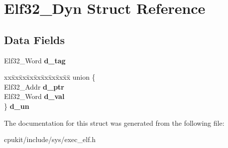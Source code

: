 \hypertarget{structElf32__Dyn}{}\section{Elf32\+\_\+\+Dyn Struct Reference}
\label{structElf32__Dyn}
\subsection*{Data Fields}
\begin{DoxyCompactItemize}
\item 
\mbox{\label{structElf32__Dyn_add890e2861dc519c8021804144c912c2}} 
Elf32\+\_\+\+Word {\bfseries d\+\_\+tag}
\item 
\mbox{\label{structElf32__Dyn_addd30a4456c276e3158cfca205c238ca}} 
\begin{tabbing}
xx\=xx\=xx\=xx\=xx\=xx\=xx\=xx\=xx\=\kill
union \{\\
\>Elf32\_Addr {\bfseries d\_ptr}\\
\>Elf32\_Word {\bfseries d\_val}\\
\} {\bfseries d\_un}\\

\end{tabbing}\end{DoxyCompactItemize}


The documentation for this struct was generated from the following file\+:\begin{DoxyCompactItemize}
\item 
cpukit/include/sys/exec\+\_\+elf.\+h\end{DoxyCompactItemize}
